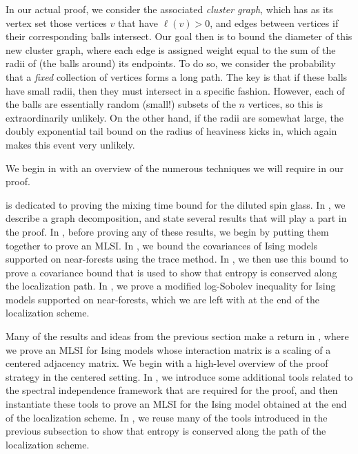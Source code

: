 \documentclass[11pt,letterpaper]{article}
\begin{document}
\medskip
In our actual proof, we consider the associated \emph{cluster graph}, which has as its vertex set those vertices $v$ that have $\ell(v) > 0$, and edges between vertices if their corresponding balls intersect. Our goal then is to bound the diameter of this new cluster graph, where each edge is assigned weight equal to the sum of the radii of (the balls around) its endpoints. To do so, we consider the probability that a \textit{fixed} collection of vertices forms a long path. The key is that if these balls have small radii, then they must intersect in a specific fashion. However, each of the balls are essentially random (small!) subsets of the $n$ vertices, so this is extraordinarily unlikely. On the other hand, if the radii are somewhat large, the doubly exponential tail bound on the radius of heaviness kicks in, which again makes this event very unlikely.

\medskip
{}
We begin in  with an overview of the numerous techniques we will require in our proof.

 is dedicated to proving the mixing time bound for the diluted spin glass. In , we describe a graph decomposition, and state several results that will play a part in the proof. In , before proving any of these results, we begin by putting them together to prove an MLSI. In , we bound the covariances of Ising models supported on near-forests using the trace method. In , we then use this bound to prove a covariance bound that is used to show that entropy is conserved along the localization path. In , we prove a modified log-Sobolev inequality for Ising models supported on near-forests, which we are left with at the end of the localization scheme.

Many of the results and ideas from the previous section make a return in , where we prove an MLSI for Ising models whose interaction matrix is a scaling of a centered adjacency matrix. We begin with a high-level overview of the proof strategy in the centered setting. In , we introduce some additional tools related to the spectral independence framework that are required for the proof, and then instantiate these tools to prove an MLSI for the Ising model obtained at the end of the localization scheme. In , we reuse many of the tools introduced in the previous subsection to show that entropy is conserved along the path of the localization scheme.
\end{document}
